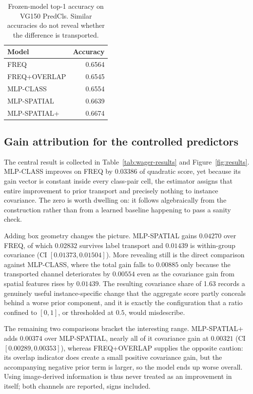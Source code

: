 \documentclass[preprint,times,10pt,a4paper]{elsarticle}
\theoremstyle{plain}
\theoremstyle{definition}
\begin{document}
\begin{table}[t]
\centering
\caption{Frozen-model top-1 accuracy on VG150 PredCls. Similar accuracies do not reveal
whether the difference is transported.}
\label{tab:accuracy}
\begin{tabular}{@{}lr@{}}
\toprule
Model & Accuracy \\
\midrule
FREQ & 0.6564 \\
FREQ+OVERLAP & 0.6545 \\
MLP-CLASS & 0.6554 \\
MLP-SPATIAL & 0.6639 \\
MLP-SPATIAL+ & 0.6674 \\
\bottomrule
\end{tabular}
\end{table}

\subsection{Gain attribution for the controlled predictors}\label{sec:results}

The central result is collected in Table~\ref{tab:wager-results} and
Figure~\ref{fig:results}. MLP-CLASS improves on FREQ by $0.03386$ of quadratic score,
yet because its gain vector is constant inside every class-pair cell, the estimator
assigns that entire improvement to prior transport and precisely nothing to instance
covariance. The zero is worth dwelling on: it follows algebraically from the construction
rather than from a learned baseline happening to pass a sanity check.

Adding box geometry changes the picture. MLP-SPATIAL gains $0.04270$ over FREQ, of which
$0.02832$ survives label transport and $0.01439$ is within-group covariance (CI
$[0.01373,0.01504]$). More revealing still is the direct comparison against MLP-CLASS,
where the total gain falls to $0.00885$ only because the transported channel deteriorates by
$0.00554$ even as the covariance gain from spatial features rises by $0.01439$. The resulting covariance share
of 1.63 records a genuinely useful instance-specific change that the aggregate score
partly conceals behind a worse prior component, and it is exactly the configuration that
a ratio confined to $[0,1]$, or thresholded at $0.5$, would misdescribe.

The remaining two comparisons bracket the interesting range. MLP-SPATIAL+ adds $0.00374$
over MLP-SPATIAL, nearly all of it covariance gain at $0.00321$ (CI $[0.00289,0.00353]$),
whereas FREQ+OVERLAP supplies the opposite caution: its overlap indicator does create a
small positive covariance gain, but the accompanying negative prior term is larger, so
the model ends up worse overall. Using image-derived information is thus never treated
as an improvement in itself; both channels are reported, signs included.
\end{document}
